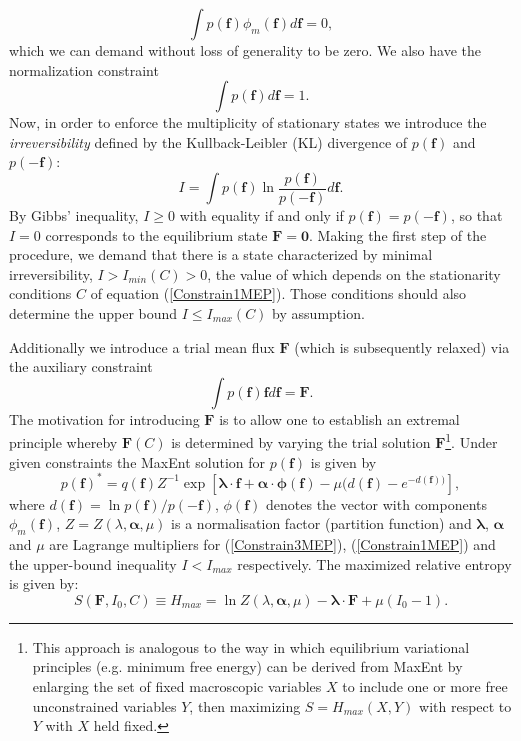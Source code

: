 \documentclass[a4paper,12pt]{article}
\begin{document}
\begin{equation}
\label{Constrain1MEP}
  \int p(\bm{f})\phi_m(\bm{f})d\bm{f} =0,
\end{equation}
which we can demand without loss of generality to be zero.
We also have the normalization constraint
\begin{equation}
\label{Constrain2MEP}
  \int p(\bm{f})d\bm{f} = 1.
\end{equation}
Now, in order to enforce the multiplicity of stationary states we introduce the \textit{irreversibility} defined by the Kullback-Leibler (KL) divergence of $p(\bm{f})$ and $p(-\bm{f})$:
\begin{equation}
\label{IrreversibilityMeasure}
  I= \int p(\bm{f}) \ln \frac{p(\bm{f})}{p(-\bm{f})} d\bm{f}.
\end{equation}
By Gibbs' inequality, $I \geq 0$ with equality if and only if $p(\bm{f})=p(-\bm{f})$, so that $I=0$ corresponds to the equilibrium state $\bm{F} = \bm{0} $.
Making the first step of the procedure, we demand that there is a state characterized by minimal irreversibility, $I>I_{min}(C)>0$, the value of which depends on the stationarity conditions $C$ of equation (\ref{Constrain1MEP}).
Those conditions should also determine the upper bound $I \leq I_{max}(C)$ by assumption.

Additionally we introduce a trial mean flux $\bm{F}$ (which is subsequently relaxed) via the auxiliary constraint
\begin{equation}
\label{Constrain3MEP}
  \int p(\bm{f})\bm{f} d\bm{f} = \bm{F}.
\end{equation}
The motivation for introducing $\bm{F}$ is to allow one to establish an extremal principle whereby $\bm{F}(C)$ is determined by varying the trial solution $\bm{F}$\footnote{This approach is analogous to the way in which equilibrium variational principles (e.g. minimum free energy) can be derived from MaxEnt by enlarging the set of fixed macroscopic variables $X$ to include one or more free unconstrained variables $Y$, then maximizing $S=H_{max}(X,Y)$ with respect to $Y$ with $X$ held fixed.}.
Under given constraints the MaxEnt solution for $p(\bm{f})$ is given by 
\begin{equation}
\label{MaxEntPDF1}
  p(\bm{f})^* = q( \bm{f} ) Z^{-1} \exp[\bm{\lambda} \cdot \bm{f}+ \bm{\alpha} \cdot \bm{\phi} (\bm{f}) - \mu ( d(\bm{f}) - e^{-d(\bm{f}))}],
\end{equation}
where $d(\bm{f})= \ln{p(\bm{f})/p(-\bm{f})}$, $\phi(\bm{f})$ denotes the vector with components $\phi_m(\bm{f})$, $Z = Z(\lambda, \bm{\alpha},\mu)$ is a normalisation factor (partition function) and $\bm{\lambda}$, $\bm{\alpha}$ and $\mu$ are Lagrange multipliers for (\ref{Constrain3MEP}), (\ref{Constrain1MEP}) and the upper-bound inequality $I<I_{max}$ respectively. The maximized relative entropy is given by:
\begin{equation}
  S(\bm{F}, I_0, C) \equiv H_{max} = \ln Z(\lambda, \bm{\alpha}, \mu) - \bm{\lambda} \cdot \bm{F} + \mu(I_0 -1).
\end{equation}
\end{document}
